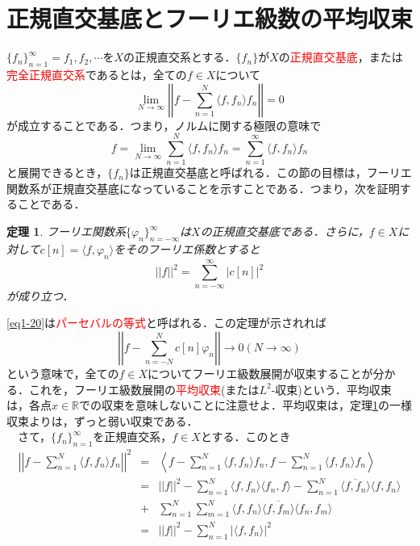 \documentclass[a4j]{jsbook}
\newtheorem{theorem}{定理}
\numberwithin{theorem}{chapter}  %
\begin{document}
\section{正規直交基底とフーリエ級数の平均収束} \label{sec1-9}
\(\{f_n\}_{n=1}^\infty={f_1, f_2, \cdots}\)を\(X\)の正規直交系とする．\(\{f_n\}\)が\(X\)の\textcolor{red}{正規直交基底}，または\textcolor{red}{完全正規直交系}であるとは，全ての\(f\in X\)について
\begin{equation*}
    \lim_{N\to\infty}\left|\left|f-\sum_{n=1}^N\langle f, f_n\rangle f_n\right|\right|=0
\end{equation*}
が成立することである．つまり，ノルムに関する極限の意味で
\begin{equation*}
    f=\lim_{N\to\infty}\sum_{n=1}^N \langle f, f_n\rangle f_n=\sum_{n=1}^\infty \langle f, f_n\rangle f_n
\end{equation*}
と展開できるとき，\(\{f_n\}\)は正規直交基底と呼ばれる．この節の目標は，フーリエ関数系が正規直交基底になっていることを示すことである．つまり，次を証明することである．
\begin{theorem}
\label{th1-6}
フーリエ関数系\(\{\varphi_n\}_{n=-\infty}^\infty\)は\(X\)の正規直交基底である．さらに，\(f\in X\)に対して\(c[n]=\langle f, \varphi_n\rangle\)をそのフーリエ係数とすると
\begin{equation}
    ||f||^2=\sum_{n=-\infty}^\infty |c[n]|^2 \label{eq1-20}
\end{equation}
が成り立つ．
\end{theorem}
\eqref{eq1-20}は\textcolor{red}{パーセバルの等式}と呼ばれる．この定理が示されれば
\begin{equation*}
    \left|\left|f-\sum_{n=-N}^N c[n]\varphi_n\right|\right|\to 0 (N\to\infty)
\end{equation*}
という意味で，全ての\(f\in X\)についてフーリエ級数展開が収束することが分かる．これを，フーリエ級数展開の\textcolor{red}{平均収束}(または\(L^2\)-収束)という．平均収束は，各点\(x\in\mathbb{R}\)での収束を意味しないことに注意せよ．平均収束は，定理\ref{th1-6}の一様収束よりは，ずっと弱い収束である．\\
　さて，\(\{f_n\}_{n=1}^\infty\)を正規直交系，\(f\in X\)とする．このとき
\begin{eqnarray}
\left|\left|f-\sum_{n=1}^N\langle f, f_n\rangle f_n\right|\right|^2&=&\left\langle f-\sum_{n=1}^N \langle f, f_n\rangle f_n, f-\sum_{n=1}^N \langle f, f_n\rangle f_n\right\rangle \nonumber \\
&=&||f||^2-\sum_{n=1}^N \langle f, f_n\rangle\langle f_n, f\rangle-\sum_{n=1}^N \overline{\langle f, f_n\rangle}\langle f, f_n\rangle \nonumber \\
&+&\sum_{n=1}^N\sum_{m=1}^N \langle f, f_n\rangle\overline{\langle f, f_m\rangle}\langle f_n, f_m\rangle \nonumber \\
&=&||f||^2-\sum_{n=1}^N |\langle f, f_n\rangle|^2 \label{eq1-21}
\end{eqnarray}
\end{document}
